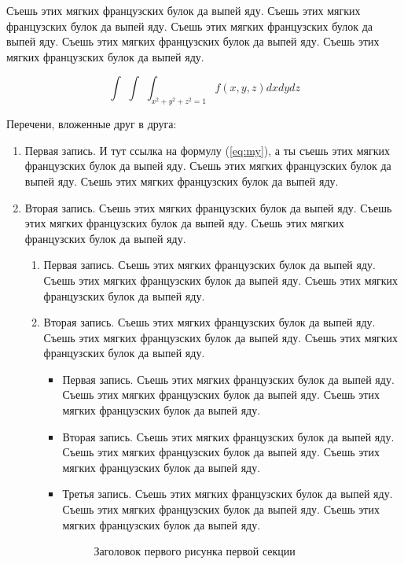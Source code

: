 \documentclass{./../class/UIR}
\begin{document}
Съешь этих мягких французских булок да выпей яду. Съешь этих мягких французских булок да выпей яду. Съешь этих мягких французских булок да выпей яду. Съешь этих мягких французских булок да выпей яду. Съешь этих мягких французских булок да выпей яду.
  
    \begin{equation}\label{eq:my}
        \int\,\,\int\,\,\int_{x^2 + y^2 + z^2 = 1} f(x, y, z) dx dy dz
    \end{equation}

    Перечени, вложенные друг в друга:
    \begin{enumerate}
        \item Первая запись. И тут ссылка на формулу (\ref{eq:my}), а ты съешь этих мягких французских булок да выпей яду. Съешь этих мягких французских булок да выпей яду. Съешь этих мягких французских булок да выпей яду.
        \item Вторая запись. Съешь этих мягких французских булок да выпей яду. Съешь этих мягких французских булок да выпей яду. Съешь этих мягких французских булок да выпей яду.
    
        \begin{enumerate}
            \item Первая запись. Съешь этих мягких французских булок да выпей яду. Съешь этих мягких французских булок да выпей яду. Съешь этих мягких французских булок да выпей яду.
            \item Вторая запись. Съешь этих мягких французских булок да выпей яду. Съешь этих мягких французских булок да выпей яду. Съешь этих мягких французских булок да выпей яду.
            
            \begin{itemize}
                \item Первая запись. Съешь этих мягких французских булок да выпей яду. Съешь этих мягких французских булок да выпей яду. Съешь этих мягких французских булок да выпей яду.
                \item Вторая запись. Съешь этих мягких французских булок да выпей яду. Съешь этих мягких французских булок да выпей яду. Съешь этих мягких французских булок да выпей яду.
                \item Третья запись. Съешь этих мягких французских булок да выпей яду. Съешь этих мягких французских булок да выпей яду. Съешь этих мягких французских булок да выпей яду.
                
                    \begin{figure}
    \caption{Заголовок первого рисунка первой секции}
    \end{figure}
    

\end{itemize}
\end{enumerate}
\end{enumerate}
\end{document}
